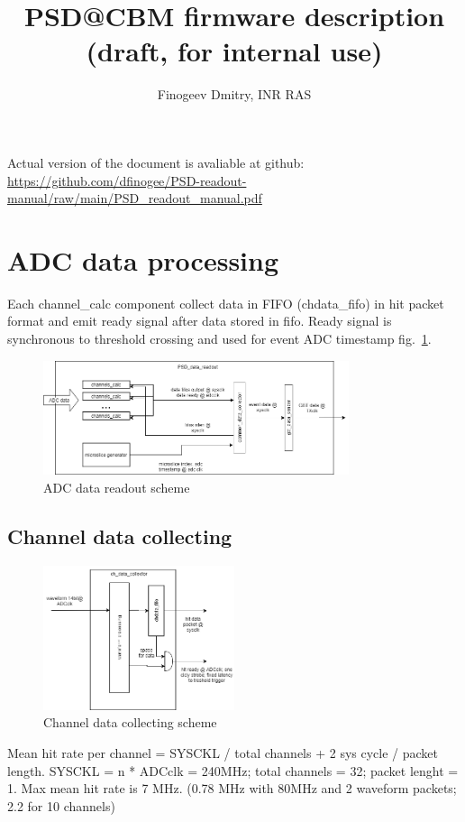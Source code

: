 \documentclass{article}
\title{PSD@CBM firmware description (draft, for internal use)}
\author{Finogeev Dmitry, INR RAS}
\begin{document}
\maketitle

Actual version of the document is avaliable at github:
\newline
\url{https://github.com/dfinogee/PSD-readout-manual/raw/main/PSD_readout_manual.pdf}



\tableofcontents

\newpage

\section{ADC data processing}

Each channel\_calc component collect data in FIFO (chdata\_fifo) in hit packet format and emit ready signal after data stored in fifo. Ready signal is synchronous to threshold crossing and used for event ADC timestamp fig.~\ref{fig:1}.

\begin{figure}[H]
	\centering 
	\includegraphics[width=0.8\textwidth]{ADC_readout.png}
	\caption{\label{fig:1} ADC data readout scheme}
\end{figure}


\subsection{Channel data collecting}


\begin{figure}[H]
	\centering 
	\includegraphics[width=0.5\textwidth]{ADC_event_collection.png}
	\caption{\label{fig:2} Channel data collecting scheme}
\end{figure}
Mean hit rate per channel = SYSCKL / total channels + 2 sys cycle / packet length. SYSCKL = n * ADCclk = 240MHz; total channels = 32; packet lenght = 1. Max mean hit rate is 7 MHz. (0.78 MHz with 80MHz and 2 waveform packets; 2.2 for 10 channels)
\end{document}
